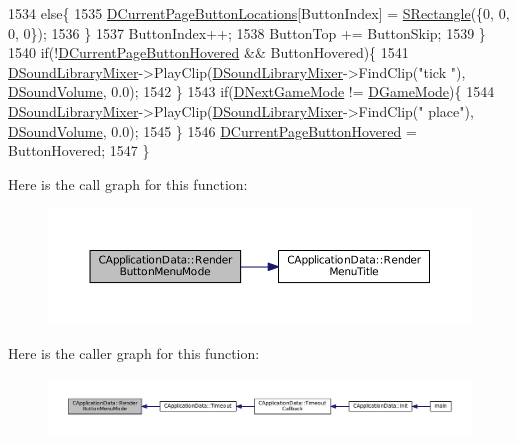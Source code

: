 \begin{DoxyCode}
1534         \textcolor{keywordflow}{else}\{
1535             \hyperlink{classCApplicationData_a3615df8e23cea3ce17f11cf61340a7b4}{DCurrentPageButtonLocations}[ButtonIndex] = 
      \hyperlink{structSRectangle}{SRectangle}(\{0, 0, 0, 0\});
1536         \}
1537         ButtonIndex++;
1538         ButtonTop += ButtonSkip;
1539     \}
1540     \textcolor{keywordflow}{if}(!\hyperlink{classCApplicationData_a96b3a9b5c9965540007dff3fa85587fa}{DCurrentPageButtonHovered} && ButtonHovered)\{
1541         \hyperlink{classCApplicationData_aa1e6876121bb4fb229ec6b930a8a6766}{DSoundLibraryMixer}->PlayClip(\hyperlink{classCApplicationData_aa1e6876121bb4fb229ec6b930a8a6766}{DSoundLibraryMixer}->FindClip(\textcolor{stringliteral}{"tick
      "}), \hyperlink{classCApplicationData_aa6e540f860dcb1929ef36ddce3be3691}{DSoundVolume}, 0.0);
1542     \}
1543     \textcolor{keywordflow}{if}(\hyperlink{classCApplicationData_a3b67edeacd70201dcf96fa9fa8aa2107}{DNextGameMode} != \hyperlink{classCApplicationData_a2f906f2b4208ecb2a057e6b62e549685}{DGameMode})\{
1544         \hyperlink{classCApplicationData_aa1e6876121bb4fb229ec6b930a8a6766}{DSoundLibraryMixer}->PlayClip(\hyperlink{classCApplicationData_aa1e6876121bb4fb229ec6b930a8a6766}{DSoundLibraryMixer}->FindClip(\textcolor{stringliteral}{"
      place"}), \hyperlink{classCApplicationData_aa6e540f860dcb1929ef36ddce3be3691}{DSoundVolume}, 0.0);
1545     \}
1546     \hyperlink{classCApplicationData_a96b3a9b5c9965540007dff3fa85587fa}{DCurrentPageButtonHovered} = ButtonHovered;
1547 \}
\end{DoxyCode}
Here is the call graph for this function\+:\nopagebreak
\begin{figure}[H]
\begin{center}
\leavevmode
\includegraphics[width=350pt]{classCApplicationData_a4766e5533d32e4194816f5a4ea838bd3_cgraph}
\end{center}
\end{figure}
Here is the caller graph for this function\+:\nopagebreak
\begin{figure}[H]
\begin{center}
\leavevmode
\includegraphics[width=350pt]{classCApplicationData_a4766e5533d32e4194816f5a4ea838bd3_icgraph}
\end{center}
\end{figure}
\hypertarget{classCApplicationData_a7da1dd0b9a8d7c68d8df5f60b4e94189}{}\label{classCApplicationData_a7da1dd0b9a8d7c68d8df5f60b4e94189} 
